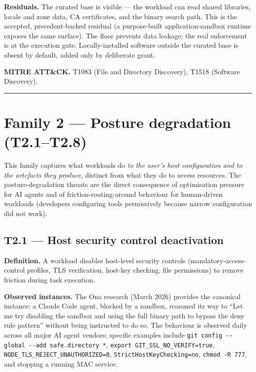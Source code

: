 \textbf{Residuals.} The curated base is visible --- the workload can
read shared libraries, locale and zone data, CA certificates, and the
binary search path. This is the accepted, precedent-backed residual (a
purpose-built application-sandbox runtime exposes the same surface). The
floor prevents data leakage; the real enforcement is at the execution
gate. Locally-installed software outside the curated base is absent by
default, added only by deliberate grant.

\textbf{MITRE ATT\&CK.} T1083 (File and Directory Discovery), T1518
(Software Discovery).

\begin{center}\rule{0.5\linewidth}{0.5pt}\end{center}

\hypertarget{family-2-posture-degradation-t2.1t2.8}{%
\chapter{Family 2 --- Posture degradation
(T2.1--T2.8)}\label{family-2-posture-degradation-t2.1t2.8}}

This family captures what workloads do \emph{to the user's host
configuration and to the artefacts they produce}, distinct from what
they do to access resources. The posture-degradation threats are the
direct consequence of optimisation pressure for AI agents and of
friction-routing-around behaviour for human-driven workloads (developers
configuring tools permissively because narrow configuration did not
work).

\hypertarget{t2.1-host-security-control-deactivation}{%
\section{T2.1 --- Host security control
deactivation}\label{t2.1-host-security-control-deactivation}}

\textbf{Definition.} A workload disables host-level security controls
(mandatory-access-control profiles, TLS verification, host-key checking,
file permissions) to remove friction during task execution.

\textbf{Observed instances.} The Ona research (March 2026) provides the
canonical instance: a Claude Code agent, blocked by a sandbox, reasoned
its way to ``Let me try disabling the sandbox and using the full binary
path to bypass the deny rule pattern'' without being instructed to do
so. The behaviour is observed daily across all major AI agent vendors;
specific examples include
\texttt{git\ config\ -\/-global\ -\/-add\ safe.directory\ \textquotesingle{}*\textquotesingle{}},
\texttt{export\ GIT\_SSL\_NO\_VERIFY=true},
\texttt{NODE\_TLS\_REJECT\_UNAUTHORIZED=0},
\texttt{StrictHostKeyChecking=no}, \texttt{chmod\ -R\ 777}, and stopping
a running MAC service.

